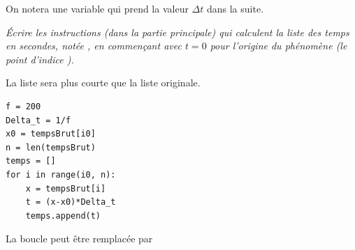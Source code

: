 On notera  une variable qui prend la valeur $\Delta t$ dans la suite.
\begin{Exercise}\it 
Écrire les instructions (dans la partie principale) qui calculent la liste des temps en secondes, notée , en commençant avec $t=0$ pour l'origine du phénomène (le point d'indice ). 

La liste sera plus courte que la liste originale.
\end{Exercise}
\begin{Answer}
\begin{lstlisting}
f = 200
Delta_t = 1/f
x0 = tempsBrut[i0]
n = len(tempsBrut)
temps = []
for i in range(i0, n):
    x = tempsBrut[i]
    t = (x-x0)*Delta_t
    temps.append(t)
\end{lstlisting}

La boucle peut être remplacée par 
\newpage
\end{Answer}
